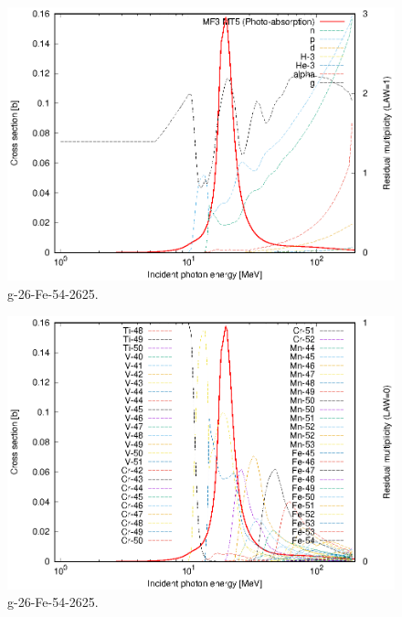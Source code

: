 \begin{figure}
 \includegraphics[width=\linewidth]{eps/g_26-Fe-54_2625.eps}
  \caption{g-26-Fe-54-2625.}
\end{figure}
\begin{figure}
 \includegraphics[width=\linewidth]{eps-law0/g_26-Fe-54_2625.eps}
 \caption{g-26-Fe-54-2625.}
\end{figure}
\newpage \clearpage

